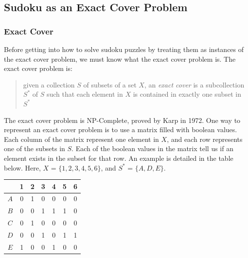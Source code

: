 \subsection{Sudoku as an Exact Cover Problem}
    \subsubsection{Exact Cover}
    Before getting into how to solve sudoku puzzles by treating them as instances of the exact cover problem, we must know
    what the exact cover problem is. The exact cover problem is:
    \begin{verse}
        given a collection $S$ of subsets of a set $X$, an \textit{exact cover} is a subcollection $S^*$ of $S$ such that each element
        in $X$ is contained in exactly one subset in $S^*$
    \end{verse}
    The exact cover problem is NP-Complete, proved by Karp in 1972\cite{npc}. One way to represent an exact cover problem is to use
    a matrix filled with boolean values. Each column of the matrix represent one element in $X$, and each row represents one of the
    subsets in $S$. Each of the boolean values in the matrix tell us if an element exists in the subset for that row. An example is
    detailed in the table below. Here, $X$ = $\{1,2,3,4,5,6\}$, and $S^*$ = $\{A,D,E\}$.
    \begin{center}\begin{tabular}{|c|c|c|c|c|c|c|}
        \hline
            &   1   &   2   &   3   &   4   &   5   &   6   \\  \hline
        $A$ &   0   &   1   &   0   &   0   &   0   &   0   \\  \hline
        $B$ &   0   &   0   &   1   &   1   &   1   &   0   \\  \hline
        $C$ &   0   &   1   &   0   &   0   &   0   &   0   \\  \hline
        $D$ &   0   &   0   &   1   &   0   &   1   &   1   \\  \hline
        $E$ &   1   &   0   &   0   &   1   &   0   &   0   \\
        \hline
    \end{tabular}\end{center}
    
